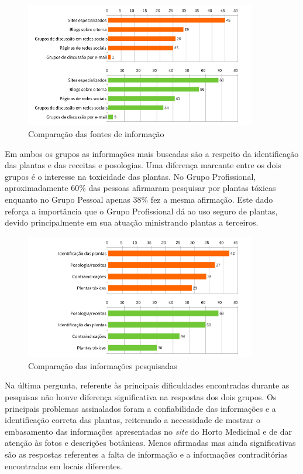\begin{figure}[!htbp]
\centering
\caption{\label{graf-canais}Comparação das fontes de informação}
\includegraphics[width=0.9\textwidth]{images/drive/image_16.png}
\end{figure}


Em ambos os grupos as informações mais buscadas são a respeito da identificação das plantas e das receitas e posologias. Uma diferença marcante entre os dois grupos é o interesse na toxicidade das plantas. No Grupo Profissional, aproximadamente 60\% das pessoas afirmaram pesquisar por plantas tóxicas enquanto no Grupo Pessoal apenas 38\% fez a mesma afirmação. Este dado reforça a importância que o Grupo Profissional dá ao uso seguro de plantas, devido principalmente em sua atuação ministrando plantas a terceiros.

\begin{figure}[!htbp]
\centering
\caption{\label{graf-infos}Comparação das informações pesquisadas}
\includegraphics[width=0.9\textwidth]{images/drive/image_17.png}
\end{figure}


Na última pergunta, referente às principais dificuldades encontradas durante as pesquisas não houve diferença significativa na respostas dos dois grupos. Os principais problemas assinalados foram a confiabilidade das informações e a identificação correta das plantas, reiterando a necessidade de mostrar o embasamento das informações apresentadas no \emph{site} do Horto Medicinal e de dar atenção às fotos e descrições botânicas. Menos afirmadas mas ainda significativas são as respostas referentes a falta de informação e a informações contraditórias encontradas em locais diferentes.

